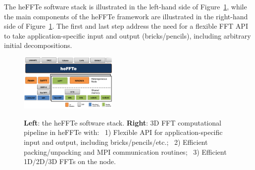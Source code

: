 The heFFTe software stack is illustrated in the left-hand side of Figure~\ref{fig:fft-ecp-pipeline}, 
while the main components of the heFFTe framework are illustrated in the right-hand side of
Figure~\ref{fig:fft-ecp-pipeline}. The first and last step address the need 
for a flexible FFT API to take application-specific input and output (bricks/pencils), 
including arbitrary initial decompositions. 
 
\begin{figure}[htb]
    \centering
    \includegraphics[width=0.42\textwidth]{projects/2.3.3-MathLibs/2.3.3.13-CLOVER/heffte}~~
    \caption{\label{fig:fft-ecp-pipeline}
    {\bf Left}: the heFFTe software stack. {\bf Right}: 3D FFT computational pipeline in heFFTe with:~
      1) Flexible API for application-specific input and output,
         including bricks/pencils/etc.;~
      2) Efficient packing/unpacking and MPI communication
         routines;~
      3) Efficient 1D/2D/3D FFTs on the node.}
\end{figure}

